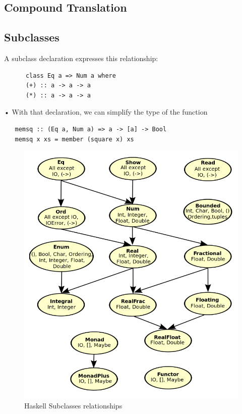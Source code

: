 \subsection{Compound Translation}
\newpage
\subsection{Subclasses}
\begin{paracol}{2}
   \vspace{\fill}
   
   A subclass declaration expresses this relationship:
   \begin{lstlisting}
      class Eq a => Num a where
      (+) :: a -> a -> a
      (*) :: a -> a -> a
   \end{lstlisting}
• With that declaration, we can simplify the type of the function

\begin{lstlisting}
   memsq :: (Eq a, Num a) => a -> [a] -> Bool
   memsq x xs = member (square x) xs
\end{lstlisting}

\vspace{\fill}
\switchcolumn

\begin{figure}[htbp]
   \centering
   \includegraphics{images/haskell_subclasses.png}
   \caption{Haskell Subclasses relationships}
   \label{fig:haskell_subclasses}
\end{figure}

\end{paracol}

